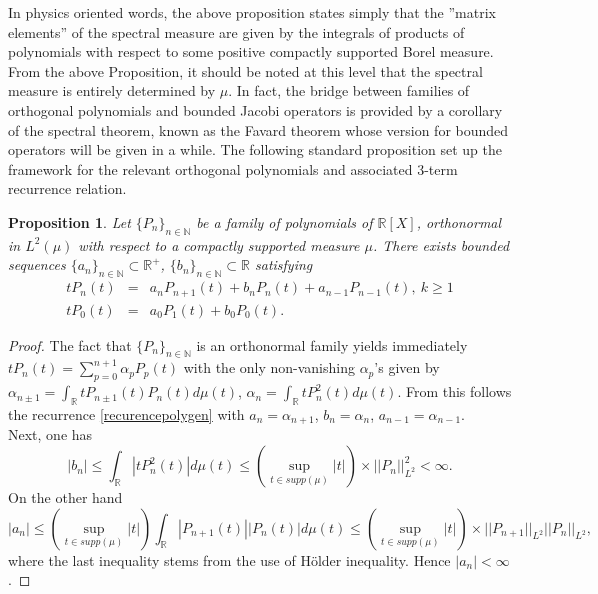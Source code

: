 \documentclass[a4paper,11pt,twoside]{article}
\numberwithin{equation}{section}
\newtheorem{proposition}[Theorem]{Proposition}
\theoremstyle{nonumberplain}
\newtheorem{proof}{Proof}
\newcounter{and}
\begin{document}
In physics oriented words, the above proposition states simply that the ''matrix elements'' of the spectral measure are given by the integrals of products of polynomials with respect to some positive compactly supported Borel measure. \\
From the above Proposition, it should be noted at this level that the spectral measure is entirely determined by $\mu$. In fact, the bridge between families of orthogonal polynomials and bounded Jacobi operators is provided by a corollary of the spectral theorem, known as the Favard theorem whose version for bounded operators will be given in a while. The following standard proposition set up the framework for the relevant orthogonal polynomials and associated 3-term recurrence relation.
\begin{proposition}\label{recur-poly}
Let $\{P_n\}_{n\in\mathbb{N}}$ be a family of polynomials of $\mathbb{R}[X]$, orthonormal in $L^2(\mu)$ with respect to a compactly supported measure $\mu$. There exists bounded sequences $\{a_n\}_{n\in\mathbb{N}}\subset\mathbb{R}^+$, $\{b_n\}_{n\in\mathbb{N}}\subset\mathbb{R}$ satisfying
\begin{eqnarray}
tP_n(t)&=&a_nP_{n+1}(t)+b_nP_n(t)+a_{n-1}P_{n-1}(t),\ k\ge1\nonumber\\
tP_0(t)&=&a_0P_1(t)+b_0P_0(t)\label{recurencepolygen}.
\end{eqnarray}
\end{proposition}
\begin{proof}
The fact that $\{P_n\}_{n\in\mathbb{N}}$ is an orthonormal family yields immediately $tP_n(t)=\sum_{p=0}^{n+1}\alpha_pP_p(t)$ with the only non-vanishing $\alpha_p$'s given by $\alpha_{n\pm1}=\int_\mathbb{R}tP_{n\pm1}(t)P_{n}(t)d\mu(t)$, $\alpha_n=\int_{\mathbb{R}}tP_n^2(t)d\mu(t)$. From this follows the recurrence \eqref{recurencepolygen} with $a_n=\alpha_{n+1}$, $b_n=\alpha_n$, $a_{n-1}=\alpha_{n-1}$. \\
Next, one has 
\begin{equation}
|b_n|\le\int_\mathbb{R}|tP_n^2(t)|d\mu(t)\le(\sup_{t\in supp(\mu)}|t|)\times||P_n||^2_{L^2}<\infty. 
\end{equation}
On the other hand 
\begin{equation}
|a_n|\le(\sup_{t\in supp(\mu)}|t|)\int_\mathbb{R}|P_{n+1}(t)||P_n(t)|d\mu(t)\le(\sup_{t\in supp(\mu)}|t|)\times||P_{n+1}||_{L^2} ||P_n||_{L^2},
\end{equation}
where the last inequality stems from the use of H\"older inequality. Hence $|a_n|<\infty$.
\end{proof}
\end{document}
